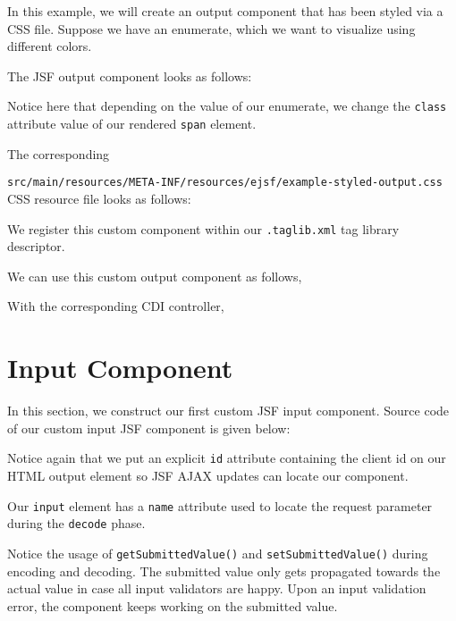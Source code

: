 In this example, we will create an output component that has been styled via a CSS file.
Suppose we have an enumerate, which we want to visualize using different colors.


The JSF output component looks as follows:

Notice here that depending on the value of our enumerate, we change the \texttt{class} attribute value of our rendered \texttt{span} element.

The corresponding

\texttt{src/main/resources/META-INF/resources/ejsf/example-styled-output.css} CSS resource file looks as follows:


We register this custom component within our \texttt{.taglib.xml} tag library descriptor.


We can use this custom output component as follows,


With the corresponding CDI controller,



\section{Input Component}
In this section, we construct our first custom JSF input component.
Source code of our custom input JSF component is given below:

Notice again that we put an explicit \texttt{id} attribute containing the client id on our HTML output element so JSF AJAX updates can locate our component.

Our \texttt{input} element has a \texttt{name} attribute used to locate the request parameter during the \texttt{decode} phase.

Notice the usage of \texttt{getSubmittedValue()} and \texttt{setSubmittedValue()} during encoding and decoding.
The submitted value only gets propagated towards the actual value in case all input validators are happy.
Upon an input validation error, the component keeps working on the submitted value.

